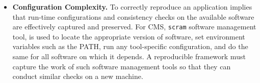 \begin{itemize}

\item {\bf Configuration Complexity.} To correctly reproduce an application implies that run-time configurations and consistency checks on the available software are effectively captured and preserved. 
For CMS,  {\tt scram} software management tool, is used to locate
the appropriate version of software,  set environment variables such as the PATH, run any
tool-specific configuration, and do the same for all software on which it depends. A reproducible framework must capture the work of such software management tools so that they can conduct similar
checks on a new machine. 



\end{itemize}
